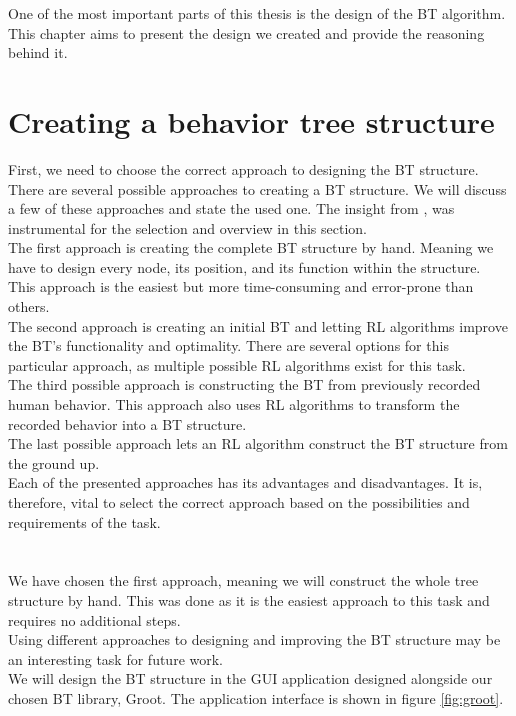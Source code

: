 One of the most important parts of this thesis is the design of the BT algorithm. This chapter aims to present the design we created and provide the reasoning behind it.

\section{Creating a behavior tree structure}
    First, we need to choose the correct approach to designing the BT structure. There are several possible approaches to creating a BT structure. We will discuss a few of these approaches and state the used one. The insight from \cite{BT_creation}, was instrumental for the selection and overview in this section.\\
    The first approach is creating the complete BT structure by hand. Meaning we have to design every node, its position, and its function within the structure. This approach is the easiest but more time-consuming and error-prone than others.\\
    The second approach is creating an initial BT and letting RL algorithms improve the BT's functionality and optimality. There are several options for this particular approach, as multiple possible RL algorithms exist for this task.\\
    The third possible approach is constructing the BT from previously recorded human behavior. This approach also uses RL algorithms to transform the recorded behavior into a BT structure.\\
    The last possible approach lets an RL algorithm construct the BT structure from the ground up.\\
    Each of the presented approaches has its advantages and disadvantages. It is, therefore, vital to select the correct approach based on the possibilities and requirements of the task.\\\\
    \\
        We have chosen the first approach, meaning we will construct the whole tree structure by hand. This was done as it is the easiest approach to this task and requires no additional steps.\\
        Using different approaches to designing and improving the BT structure may be an interesting task for future work.\\
        We will design the BT structure in the GUI application designed alongside our chosen BT library, Groot. The application interface is shown in figure \ref{fig:groot}.\\\\
